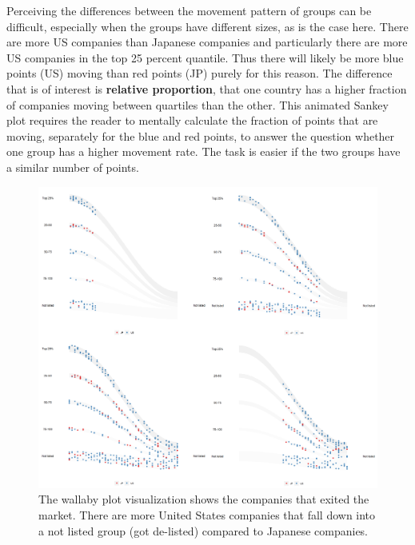 Perceiving the differences between the movement pattern of groups can be difficult, especially when the groups have different sizes, as is the case here. There are more US companies than Japanese companies and particularly there are more US companies in the top 25 percent quantile. Thus there will likely be more blue points (US) moving than red points (JP) purely for this reason. The difference that is of interest is \textbf{relative proportion}, that one country has a higher fraction of companies moving between quartiles than the other. This animated Sankey plot requires the reader to mentally calculate the fraction of points that are moving, separately for the blue and red points, to answer the question whether one group has a higher movement rate. The task is easier if the two groups have a similar number of points.

\begin{figure}

{\centering \includegraphics[width=1\linewidth]{figures/animation-exit} 

}

\caption{The wallaby plot visualization shows the companies that exited the market. There are more United States companies that fall down into a not listed group (got de-listed) compared to Japanese companies.}\label{fig:osiris-figure}
\end{figure}

